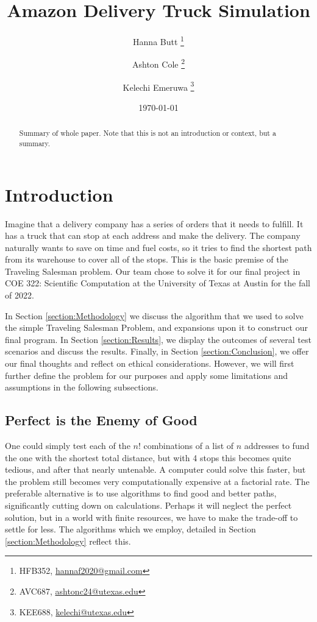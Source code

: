 \documentclass[letterpaper]{article}
\title{Amazon Delivery Truck Simulation}
\author{Hanna Butt \thanks{HFB352, \href{mailto:hannaf2020@gmail.com}{hannaf2020@gmail.com}} \and Ashton Cole \thanks{AVC687, \href{mailto:ashtonc24@utexas.edu}{ashtonc24@utexas.edu}} \and Kelechi Emeruwa \thanks{KEE688, \href{mailto:kelechi@utexas.edu}{kelechi@utexas.edu}}}
\date{\today}
\begin{document}
    \maketitle

    \begin{abstract}
        Summary of whole paper. Note that this is not an introduction or context, but a summary.
    \end{abstract}

    \section{Introduction}
    \label{section:Introduction}
    Imagine that a delivery company has a series of orders that it needs to fulfill. It has a truck that can stop at each address and make the delivery. The company naturally wants to save on time and fuel costs, so it tries to find the shortest path from its warehouse to cover all of the stops. This is the basic premise of the Traveling Salesman problem. Our team chose to solve it for our final project in COE 322: Scientific Computation at the University of Texas at Austin for the fall of 2022.
    
    In Section \ref{section:Methodology} we discuss the algorithm that we used to solve the simple Traveling Salesman Problem, and expansions upon it to construct our final program. In Section \ref{section:Results}, we display the outcomes of several test scenarios and discuss the results. Finally, in Section \ref{section:Conclusion}, we offer our final thoughts and reflect on ethical considerations. However, we will first further define the problem for our purposes and apply some limitations and assumptions in the following subsections.

    \subsection{Perfect is the Enemy of Good}
    \label{subsection:Perfect_is_the_Enemy_of_Good}
    One could simply test each of the $n!$ combinations of a list of $n$ addresses to fund the one with the shortest total distance, but with 4 stops this becomes quite tedious, and after that nearly untenable. A computer could solve this faster, but the problem still becomes very computationally expensive at a factorial rate. The preferable alternative is to use algorithms to find good and better paths, significantly cutting down on calculations. Perhaps it will neglect the perfect solution, but in a world with finite resources, we have to make the trade-off to settle for less. The algorithms which we employ, detailed in Section \ref{section:Methodology} reflect this.
\end{document}
